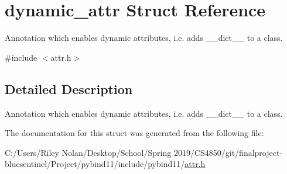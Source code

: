 \hypertarget{structdynamic__attr}{}\section{dynamic\+\_\+attr Struct Reference}
\label{structdynamic__attr}


Annotation which enables dynamic attributes, i.\+e. adds {\ttfamily \+\_\+\+\_\+dict\+\_\+\+\_\+} to a class.  




{\ttfamily \#include $<$attr.\+h$>$}



\subsection{Detailed Description}
Annotation which enables dynamic attributes, i.\+e. adds {\ttfamily \+\_\+\+\_\+dict\+\_\+\+\_\+} to a class. 

The documentation for this struct was generated from the following file\+:\begin{DoxyCompactItemize}
\item 
C\+:/\+Users/\+Riley Nolan/\+Desktop/\+School/\+Spring 2019/\+C\+S4850/git/finalproject-\/bluesentinel/\+Project/pybind11/include/pybind11/\mbox{\hyperlink{attr_8h}{attr.\+h}}\end{DoxyCompactItemize}
